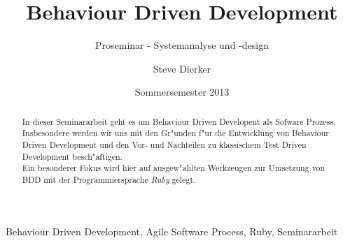 \documentclass[runningheads,a4paper]{llncs}
\newcommand{\keywords}[1]{\par\addvspace\baselineskip
\noindent\keywordname\enspace\ignorespaces#1}
\begin{document}
\mainmatter

\title{Behaviour Driven Development}
\subtitle{Proseminar - Systemanalyse und -design}
\date{Sommersemester 2013}

\author{Steve Dierker}


\maketitle

\begin{abstract}
  In dieser Seminararbeit geht es um Behaviour Driven Developent als Sofware 
  Prozess. Insbesondere werden wir uns mit den Gr"unden f"ur die Entwicklung von
  Behaviour Driven Development und den Vor- und Nachteilen zu klassischem Test 
  Driven Development besch"aftigen.\\
  Ein besonderer Fokus wird hier auf ausgew"ahlten Werkzeugen zur Umsetzung von 
  BDD mit der Programmiersprache {\em Ruby} gelegt.
\end{abstract}

\keywords{Behaviour Driven Development, Agile Software Process, Ruby, Seminararbeit}









\end{document}
